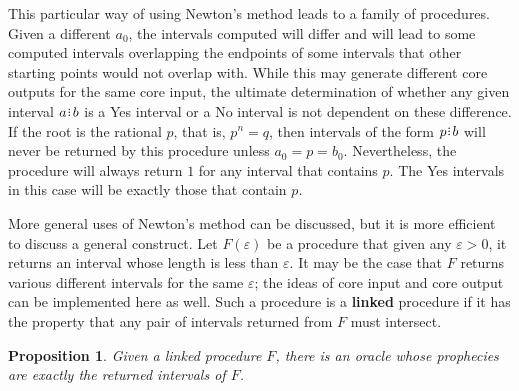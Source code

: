 \documentclass[12pt]{article}
\newtheorem{proposition}{Proposition}[section]
\begin{document}
This particular way of using Newton's method leads to a family of procedures. Given a different $a_0$, the intervals computed will differ and will lead to some computed intervals overlapping the endpoints of some intervals that other starting points would not overlap with. While this may generate different core outputs for the same core input, the ultimate determination of whether any given interval $a\rint b$ is a Yes interval or a No interval is not dependent on these difference.  If the root is the rational $p$, that is, $p^n = q$,  then intervals of the form $p\rint b$ will never be returned by this procedure unless $a_0 = p = b_0$. Nevertheless, the procedure will always return $1$ for any interval that contains $p$. The Yes intervals in this case will be exactly those that contain $p$. 

More general uses of Newton's method can be discussed, but it is more efficient to discuss a general construct. Let $F(\varepsilon)$ be a procedure that given any $\varepsilon > 0$, it returns an interval whose length is less than $\varepsilon$. It may be the case that $F$ returns various different intervals for the same $\varepsilon$; the ideas of core input and core output can be implemented here as well. Such a procedure is a \textbf{linked} procedure if it has the property that any pair of intervals returned from $F$ must intersect. 

\begin{proposition}\label{os-linked}
    Given a linked procedure $F$, there is an oracle whose prophecies are exactly the returned intervals of $F$. 
\end{proposition}
\end{document}
